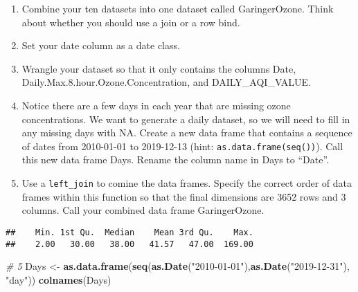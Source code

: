 \documentclass[
]{article}
\newenvironment{Shaded}{\begin{snugshade}}{\end{snugshade}}
\newcommand{\CommentTok}[1]{\textcolor[rgb]{0.56,0.35,0.01}{\textit{#1}}}
\newcommand{\DataTypeTok}[1]{\textcolor[rgb]{0.13,0.29,0.53}{#1}}
\newcommand{\FloatTok}[1]{\textcolor[rgb]{0.00,0.00,0.81}{#1}}
\newcommand{\KeywordTok}[1]{\textcolor[rgb]{0.13,0.29,0.53}{\textbf{#1}}}
\newcommand{\NormalTok}[1]{#1}
\newcommand{\OperatorTok}[1]{\textcolor[rgb]{0.81,0.36,0.00}{\textbf{#1}}}
\newcommand{\StringTok}[1]{\textcolor[rgb]{0.31,0.60,0.02}{#1}}
\begin{document}
\begin{enumerate}
\def\labelenumi{\arabic{enumi}.}
\setcounter{enumi}{1}
\item
  Combine your ten datasets into one dataset called GaringerOzone. Think
  about whether you should use a join or a row bind.
\item
  Set your date column as a date class.
\item
  Wrangle your dataset so that it only contains the columns Date,
  Daily.Max.8.hour.Ozone.Concentration, and DAILY\_AQI\_VALUE.
\item
  Notice there are a few days in each year that are missing ozone
  concentrations. We want to generate a daily dataset, so we will need
  to fill in any missing days with NA. Create a new data frame that
  contains a sequence of dates from 2010-01-01 to 2019-12-13 (hint:
  \texttt{as.data.frame(seq())}). Call this new data frame Days. Rename
  the column name in Days to ``Date''.
\item
  Use a \texttt{left\_join} to comine the data frames. Specify the
  correct order of data frames within this function so that the final
  dimensions are 3652 rows and 3 columns. Call your combined data frame
  GaringerOzone.
\end{enumerate}

\begin{Shaded}
\end{Shaded}

\begin{verbatim}
##    Min. 1st Qu.  Median    Mean 3rd Qu.    Max. 
##    2.00   30.00   38.00   41.57   47.00  169.00
\end{verbatim}

\begin{Shaded}
\begin{Highlighting}[]
\CommentTok{# 5}
\NormalTok{Days <-}\StringTok{ }\KeywordTok{as.data.frame}\NormalTok{(}\KeywordTok{seq}\NormalTok{(}\KeywordTok{as.Date}\NormalTok{(}\StringTok{"2010-01-01"}\NormalTok{),}\KeywordTok{as.Date}\NormalTok{(}\StringTok{"2019-12-31"}\NormalTok{), }\StringTok{"day"}\NormalTok{)) }
\KeywordTok{colnames}\NormalTok{(Days)}
\end{Highlighting}
\end{Shaded}
\end{document}
